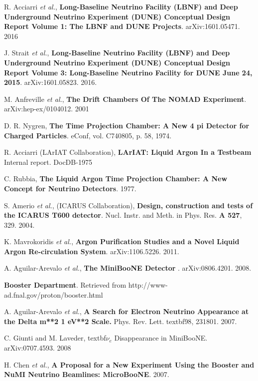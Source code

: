  R. Acciarri \textit{et al.}, \textbf{Long-Baseline Neutrino Facility (LBNF) and Deep Underground Neutrino Experiment (DUNE) Conceptual Design Report Volume 1: The LBNF and DUNE Projects}. 	arXiv:1601.05471. 2016 

 J. Strait \textit{et al.}, \textbf{Long-Baseline Neutrino Facility (LBNF) and Deep Underground Neutrino Experiment (DUNE) Conceptual Design Report Volume 3: Long-Baseline Neutrino Facility for DUNE June 24, 2015}. arXiv:1601.05823. 2016.

 M. Anfreville \textit{et al.}, \textbf{The Drift Chambers Of The NOMAD Experiment}. 	arXiv:hep-ex/0104012. 2001

 D. R. Nygren, \textbf{The Time Projection Chamber: A New 4 pi Detector for Charged Particles}. eConf, vol. C740805, p. 58, 1974.

 R. Acciarri (LArIAT Collaboration), \textbf{LArIAT:
Liquid Argon In a Testbeam} Internal report. DocDB-1975

 C. Rubbia, \textbf{The Liquid Argon Time Projection Chamber: A New Concept for Neutrino Detectors}. 1977.

 S. Amerio \textit{et al.}, (ICARUS Collaboration), \textbf{Design, construction and tests of the ICARUS T600 detector}. Nucl. Instr. and Meth. in Phys. Res. \textbf{A 527}, 329. 2004.

 K. Mavrokoridis \textit{et al.}, \textbf{Argon Purification Studies and a Novel Liquid Argon Re-circulation System}. arXiv:1106.5226. 2011.	

 A. Aguilar-Arevalo \textit{et al.}, \textbf{The MiniBooNE Detector
}. arXiv:0806.4201. 2008.

 \textbf{Booster Department}. Retrieved from http://www-ad.fnal.gov/proton/booster.html

 A. Aguilar-Arevalo \textit{et al.}, \textbf{A Search for Electron Neutrino Appearance at the Delta m**2 1 eV**2 Scale.} Phys. Rev. Lett. textbf{98}, 231801. 2007. 

 C. Giunti and M. Laveder, textbf{$\nu_e$ Disappearance in MiniBooNE}. arXiv:0707.4593. 2008


 H. Chen \textit{et al.}, \textbf{A Proposal for a New Experiment Using the Booster and NuMI Neutrino Beamlines: MicroBooNE}. 2007.


